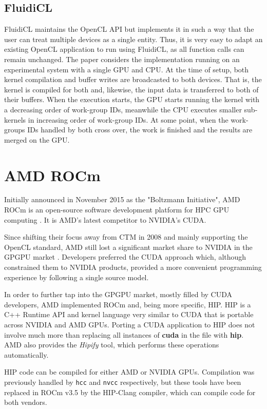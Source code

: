 \subsection{FluidiCL}
FluidiCL \cite{fluidicl} maintains the OpenCL API but implements it in such a way that the user can treat multiple devices as a single entity. Thus, it is very easy to adapt an existing OpenCL application to run using FluidiCL, as all function calls can remain unchanged. The paper considers the implementation running on an experimental system with a single GPU and CPU. At the time of setup, both kernel compilation and buffer writes are broadcasted to both devices. That is, the kernel is compiled for both and, likewise, the input data is transferred to both of their buffers. When the execution starts, the GPU starts running the kernel with a decreasing order of work-group IDs, meanwhile the CPU executes smaller sub-kernels in increasing order of work-group IDs. At some point, when the work-groups IDs handled by both cross over, the work is finished and the results are merged on the GPU.

\section{AMD ROCm}
Initially announced in November 2015 as the "Boltzmann Initiative", AMD ROCm is an open-source software development platform for HPC GPU computing \cite{boltzmann_initiative}. It is AMD's latest competitor to NVIDIA's CUDA.

Since shifting their focus away from CTM in 2008 and mainly supporting the OpenCL standard, AMD still lost a significant market share to NVIDIA in the GPGPU market \cite{amd_as_alternative}. Developers preferred the CUDA approach which, although constrained them to NVIDIA products, provided a more convenient programming experience by following a single source model.

In order to further tap into the GPGPU market, mostly filled by CUDA developers, AMD implemented ROCm and, being more specific, HIP. HIP is a C++ Runtime API and kernel language very similar to CUDA that is portable across NVIDIA and AMD GPUs. Porting a CUDA application to HIP does not involve much more than replacing all instances of \textbf{cuda} in the file with \textbf{hip}. AMD also provides the \textit{Hipify} tool, which performs these operations automatically.

HIP code can be compiled for either AMD or NVIDIA GPUs. Compilation was previously handled by \texttt{hcc} and \texttt{nvcc} respectively, but these tools have been replaced in ROCm v3.5 by the HIP-Clang compiler, which can compile code for both vendors.

